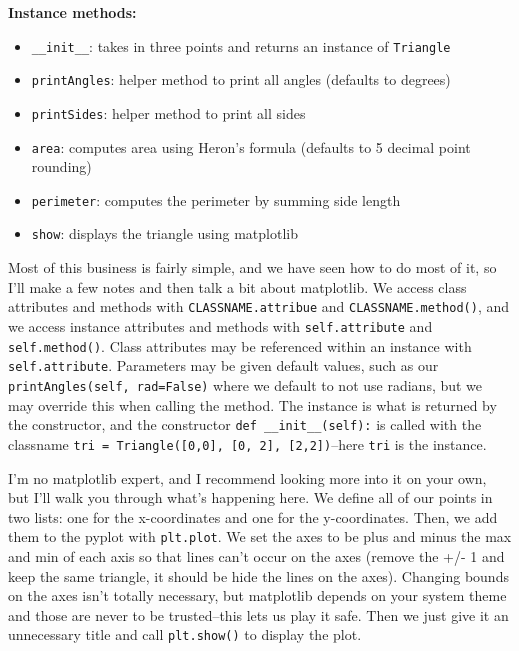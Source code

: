 \documentclass[11pt, twoside, reqno]{book}
\begin{document}
\textbf{Instance methods:}
\begin{itemize} \item \texttt{\_\_init\_\_}: takes in three points and returns an instance of \texttt{Triangle}\end{itemize}
\begin{itemize} \item \texttt{printAngles}: helper method to print all angles (defaults to degrees)\end{itemize}
\begin{itemize} \item \texttt{printSides}: helper method to print all sides\end{itemize}
\begin{itemize} \item \texttt{area}: computes area using Heron's formula (defaults to 5 decimal point rounding)\end{itemize}
\begin{itemize} \item \texttt{perimeter}: computes the perimeter by summing side length\end{itemize}
\begin{itemize} \item \texttt{show}: displays the triangle using matplotlib\end{itemize}

Most of this business is fairly simple, and we have seen how to do most of it, so I'll make a few notes and then talk a bit about matplotlib. We access class attributes and methods with \texttt{CLASSNAME.attribue} and \texttt{CLASSNAME.method()}, and we access instance attributes and methods with \texttt{self.attribute} and \texttt{self.method()}. Class attributes may be referenced within an instance with \texttt{self.attribute}. Parameters may be given default values, such as our \texttt{printAngles(self, rad=False)} where we default to not use radians, but we may override this when calling the method. The instance is what is returned by the constructor, and the constructor \texttt{def \_\_init\_\_(self):} is called with the classname \texttt{tri = Triangle([0,0], [0, 2], [2,2])}--here \texttt{tri} is the instance.

I'm no matplotlib expert, and I recommend looking more into it on your own, but I'll walk you through what's happening here. We define all of our points in two lists: one for the x-coordinates and one for the y-coordinates. Then, we add them to the pyplot with \texttt{plt.plot}. We set the axes to be plus and minus the max and min of each axis so that lines can't occur on the axes (remove the +/- 1 and keep the same triangle, it should be hide the lines on the axes). Changing bounds on the axes isn't totally necessary, but matplotlib depends on your system theme and those are never to be trusted--this lets us play it safe. Then we just give it an unnecessary title and call \texttt{plt.show()} to display the plot.
\end{document}
